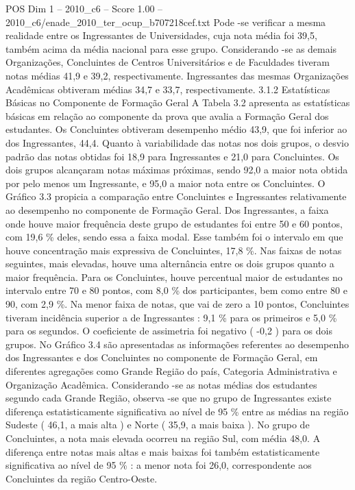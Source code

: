 \begin{textsample}{POS Dim 1 – 2010\_c6 – Score 1.00 – 2010\_c6/enade\_2010\_ter\_ocup\_b707218cef.txt}
Pode -se verificar a mesma realidade entre os Ingressantes de Universidades, cuja nota média foi 39,5, também acima da média nacional para esse grupo.
Considerando -se as demais Organizações, Concluintes de Centros Universitários e de Faculdades tiveram notas médias 41,9 e 39,2, respectivamente.
Ingressantes das mesmas Organizações Acadêmicas obtiveram médias 34,7 e 33,7, respectivamente. 3.1.2 Estatísticas Básicas no Componente de Formação Geral A Tabela 3.2 apresenta as estatísticas básicas em relação ao componente da prova que avalia a Formação Geral dos estudantes.
Os Concluintes obtiveram desempenho médio 43,9, que foi inferior ao dos Ingressantes, 44,4.
Quanto à variabilidade das notas nos dois grupos, o desvio padrão das notas obtidas foi 18,9 para Ingressantes e 21,0 para Concluintes.
Os dois grupos alcançaram notas máximas próximas, sendo 92,0 a maior nota obtida por pelo menos um Ingressante, e 95,0 a maior nota entre os Concluintes.
O Gráfico 3.3 propicia a comparação entre Concluintes e Ingressantes relativamente ao desempenho no componente de Formação Geral.
Dos Ingressantes, a faixa onde houve maior frequência deste grupo de estudantes foi entre 50 e 60 pontos, com 19,6 \% deles, sendo essa a faixa modal.
Esse também foi o intervalo em que houve concentração mais expressiva de Concluintes, 17,8 \%.
Nas faixas de notas seguintes, mais elevadas, houve uma alternância entre os dois grupos quanto a maior frequência.
Para os Concluintes, houve percentual maior de estudantes no intervalo entre 70 e 80 pontos, com 8,0 \% dos participantes, bem como entre 80 e 90, com 2,9 \%.
Na menor faixa de notas, que vai de zero a 10 pontos, Concluintes tiveram incidência superior a de Ingressantes : 9,1 \% para os primeiros e 5,0 \% para os segundos.
O coeficiente de assimetria foi negativo ( -0,2 ) para os dois grupos.
No Gráfico 3.4 são apresentadas as informações referentes ao desempenho dos Ingressantes e dos Concluintes no componente de Formação Geral, em diferentes agregações como Grande Região do país, Categoria Administrativa e Organização Acadêmica.
Considerando -se as notas médias dos estudantes segundo cada Grande Região, observa -se que no grupo de Ingressantes existe diferença estatisticamente significativa ao nível de 95 \% entre as médias na região Sudeste ( 46,1, a mais alta ) e Norte ( 35,9, a mais baixa ).
No grupo de Concluintes, a nota mais elevada ocorreu na região Sul, com média 48,0.
A diferença entre notas mais altas e mais baixas foi também estatisticamente significativa ao nível de 95 \% : a menor nota foi 26,0, correspondente aos Concluintes da região Centro-Oeste.

\end{textsample}
